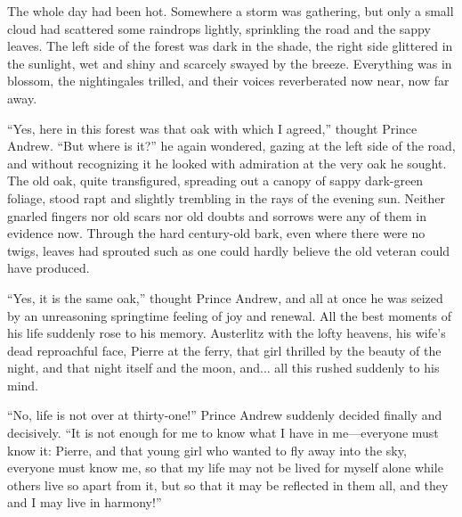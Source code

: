 The whole day had been hot. Somewhere a storm was gathering, but
only a small cloud had scattered some raindrops lightly,
sprinkling the road and the sappy leaves. The left side of the
forest was dark in the shade, the right side glittered in the
sunlight, wet and shiny and scarcely swayed by the
breeze. Everything was in blossom, the nightingales trilled, and
their voices reverberated now near, now far away.

``Yes, here in this forest was that oak with which I agreed,''
thought Prince Andrew. ``But where is it?'' he again wondered,
gazing at the left side of the road, and without recognizing it
he looked with admiration at the very oak he sought. The old oak,
quite transfigured, spreading out a canopy of sappy dark-green
foliage, stood rapt and slightly trembling in the rays of the
evening sun. Neither gnarled fingers nor old scars nor old doubts
and sorrows were any of them in evidence now.  Through the hard
century-old bark, even where there were no twigs, leaves had
sprouted such as one could hardly believe the old veteran could
have produced.

``Yes, it is the same oak,'' thought Prince Andrew, and all at
once he was seized by an unreasoning springtime feeling of joy
and renewal. All the best moments of his life suddenly rose to
his memory. Austerlitz with the lofty heavens, his wife's dead
reproachful face, Pierre at the ferry, that girl thrilled by the
beauty of the night, and that night itself and the moon,
and... all this rushed suddenly to his mind.

``No, life is not over at thirty-one!'' Prince Andrew suddenly
decided finally and decisively. ``It is not enough for me to know
what I have in me---everyone must know it: Pierre, and that young
girl who wanted to fly away into the sky, everyone must know me,
so that my life may not be lived for myself alone while others
live so apart from it, but so that it may be reflected in them
all, and they and I may live in harmony!''

